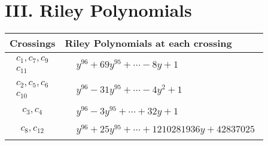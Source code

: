 \documentclass[1p]{elsarticle_modified}
\theoremstyle{definition}
\begin{document}
\centering \section*{ III. Riley Polynomials}
\begin{tabular}{m{50pt}|m{274pt}}
Crossings & \hspace{64pt}Riley Polynomials at each crossing \\
\hline $$\begin{aligned}c_{1},c_{7},c_{9}\\c_{11}\end{aligned}$$&$\begin{aligned}
&y^{96}+69 y^{95}+\cdots-8 y+1
\end{aligned}$\\
\hline $$\begin{aligned}c_{2},c_{5},c_{6}\\c_{10}\end{aligned}$$&$\begin{aligned}
&y^{96}-31 y^{95}+\cdots-4 y^2+1
\end{aligned}$\\
\hline $$\begin{aligned}c_{3},c_{4}\end{aligned}$$&$\begin{aligned}
&y^{96}-3 y^{95}+\cdots+32 y+1
\end{aligned}$\\
\hline $$\begin{aligned}c_{8},c_{12}\end{aligned}$$&$\begin{aligned}
&y^{96}+25 y^{95}+\cdots+1210281936 y+42837025
\end{aligned}$\\
\hline
\end{tabular}
\vskip 2pc
\end{document}
